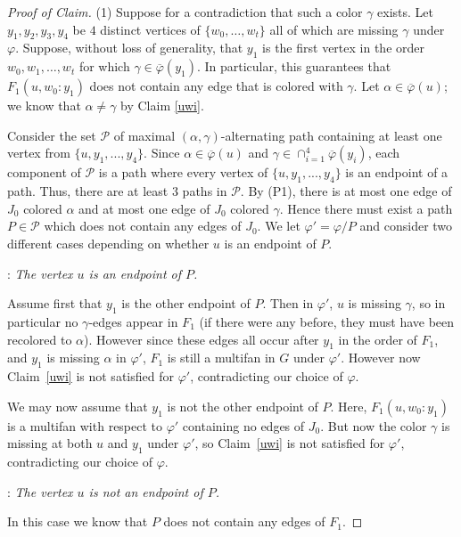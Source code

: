 \documentclass[10pt,a4paper]{amsart}
\newcommand{\pbar}{\overline{\varphi}}
\newenvironment{proofc}{\begin{proof}[Proof of Claim]}{\end{proof}}
\begin{document}
\begin{proofc}  
(1) Suppose for a contradiction that such a color $\gamma$ exists.  Let  $y_1, y_2, y_3,  y_{4}$ be $4$  distinct vertices of $\{w_0, \ldots, w_t\}$ all of which are missing $\gamma$ under $\varphi$. Suppose, without loss of generality, that $y_1$ is the first vertex 
in the order $w_0, w_1, \ldots, w_t$ for which $\gamma\in \pbar(y_1)$.  In particular, this guarantees that $F_1(u, w_0:y_1)$ does not contain any edge that is colored with $\gamma$. 
Let $\alpha\in \pbar(u)$; we know that $\alpha\ne \gamma$ by Claim \ref{uwi}. 



Consider the set $\mathcal{P}$ of maximal $(\alpha,\gamma)$-alternating
path containing at least one vertex from $\{u,y_1,...,y_4\}$. Since $\alpha\in \pbar(u)$ and $\gamma\in \cap_{i=1}^4\pbar(y_i)$, each component of $\mathcal{P}$ is a path where every vertex of $\{u,y_1,...,y_4\}$ is an endpoint of a path. Thus, there are at least $3$ paths in $\mathcal{P}$. By (P1), there is at most one edge of $J_0$ colored $\alpha$ and at most one edge of $J_0$ colored $\gamma$. Hence there must exist a path $P\in \mathcal{P}$ which does not contain any edges of $J_0$. We let $\varphi' = \varphi/P$ and consider two different cases depending on whether $u$ is an endpoint of $P$.

:  \emph{The vertex $u$ is an endpoint of $P$.}


Assume first that $y_1$ is the other endpoint of $P$. Then in $\varphi'$, $u$ is missing $\gamma$, so in particular no $\gamma$-edges appear in $F_1$ (if there were any before, they must have been recolored to $\alpha$). However since these edges all occur after $y_1$ in the order of  $F_1$, and $y_1$ is missing $\alpha$ in $\varphi'$, $F_1$ is still a multifan in $G$ under $\varphi'$. However now Claim~\ref{uwi} is not satisfied for $\varphi'$, contradicting  our choice of $\varphi$.

We may now assume that $y_1$ is not the other endpoint of $P$. Here, $F_1(u, w_0:y_1)$ is a multifan with respect to $\varphi'$ containing no edges of $J_0$. But now the color $\gamma$ is missing at both $u$ and $y_1$ under $\varphi'$, so Claim~\ref{uwi} is not satisfied for $\varphi'$, contradicting our choice of $\varphi$. 


:  \emph{The vertex $u$ is not an endpoint of $P$.}   

In this case we know that $P$ does not contain any edges of $F_1$. 


\end{proofc}
\end{document}
